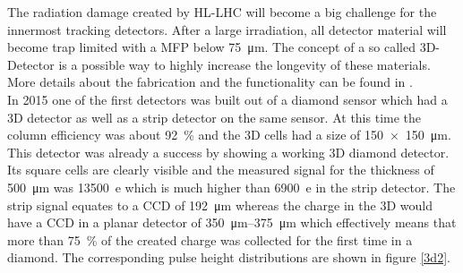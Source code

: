 The radiation damage created by \ac{HL-LHC} will become a big challenge for the innermost tracking detectors. After a large irradiation, all detector material will become trap limited with a \ac{MFP} below \SI{75}{\micro\meter}. The concept of a so called 3D-Detector is a possible way to highly increase the longevity of these materials. More details about the fabrication and the functionality can be found in \cite{3D}.\\
In 2015 one of the first detectors was built out of a \pcvd diamond sensor which had a 3D detector 
as well as a strip detector on the same sensor. At this time the column efficiency was about \SI{92}{\%} and the 3D cells had a size of \SI{150x150}{\micro\meter}. This detector was already a success by showing a working 3D diamond detector. Its square cells are clearly visible and the measured signal for the thickness of \SI{500}{\micro\meter} was \SI{13500}{e} which is much higher than \SI{6900}{e} in the strip detector. The strip signal equates to a \ac{CCD} of \SI{192}{\micro\meter} whereas the charge in the 3D would have a \ac{CCD} in a planar detector of \SIrange{350}{375}{\micro\meter} which effectively means that more than \SI{75}{\%} of the created charge was collected for the first time in a \pcvd diamond. The corresponding pulse height distributions are shown in figure \vref{3d2}.\\

